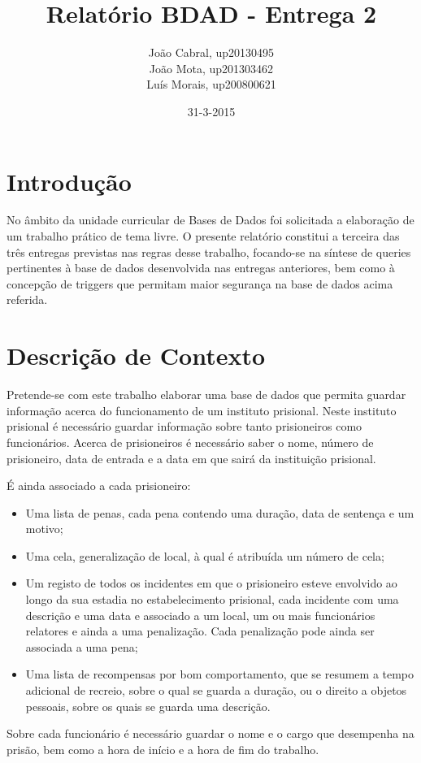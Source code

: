 \documentclass{article}
\title{Relatório BDAD - Entrega 2}
\date{31-3-2015}
\author{João Cabral, up20130495\\
	   João Mota, up201303462\\
	   Luís Morais, up200800621\\}
\begin{document}
\maketitle
{}
\newpage
{}
\renewcommand*\contentsname{Sumário}
\tableofcontents
\newpage
\section{Introdução}
No âmbito da unidade curricular de Bases de Dados foi solicitada a elaboração de um
trabalho prático de tema livre. O presente relatório constitui a terceira das três entregas
previstas nas regras desse trabalho, focando-se na síntese de queries pertinentes à 
base de dados desenvolvida nas entregas anteriores, bem como
à concepção de triggers que permitam maior segurança na base de dados acima referida.


\section{Descrição de Contexto}
Pretende-se com este trabalho elaborar uma base de dados que permita guardar
informação acerca do funcionamento de um instituto prisional. Neste instituto prisional é
necessário guardar informação sobre tanto prisioneiros como funcionários.
Acerca de prisioneiros é necessário saber o nome, número de prisioneiro, data de entrada
e a data em que sairá da instituição prisional.

É ainda associado a cada prisioneiro:
\begin{itemize}
\item Uma lista de penas, cada pena contendo uma duração, data de sentença e um motivo;
\item Uma cela, generalização de local, à qual é atribuída um número de cela;
\item Um registo de todos os incidentes em que o prisioneiro esteve envolvido ao longo da sua estadia no estabelecimento prisional, cada incidente com uma descrição e uma data e associado a um local, um ou mais funcionários relatores e ainda a uma penalização. Cada penalização pode ainda ser associada a uma pena;
\item Uma lista de recompensas por bom comportamento, que se resumem a tempo adicional de recreio, sobre o qual se guarda a duração, ou o direito a objetos pessoais, sobre os quais se guarda uma descrição.
\end{itemize}
Sobre cada funcionário é necessário guardar o nome e o cargo que desempenha na prisão, bem como a hora de início e a hora de fim do trabalho.
\newpage
\end{document}
